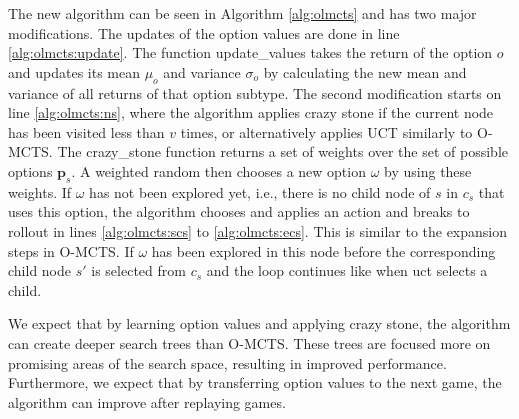 The new algorithm can be seen in Algorithm \ref{alg:olmcts} and has two major
modifications. The updates of the option values are done in line
\ref{alg:olmcts:update}. The function \textsf{update\_values} takes the return
of the option $o$ and updates its mean $\mu_o$ and variance $\sigma_o$ by
calculating the new mean and variance of all returns of that option subtype. The
second modification starts on line \ref{alg:olmcts:ns}, where the algorithm
applies crazy stone if the current node has been visited less than $v$ times, or
alternatively applies UCT similarly to O-MCTS. The \textsf{crazy\_stone}
function returns a set of weights over the set of possible options
$\mathbf{p}_s$. A weighted random then chooses a new option $\omega$ by using
these weights.  If $\omega$ has not been explored yet, i.e., there is no child
node of $s$ in $c_s$ that uses this option, the algorithm chooses and applies an
action and breaks to rollout in lines \ref{alg:olmcts:scs} to
\ref{alg:olmcts:ecs}. This is similar to the expansion steps in O-MCTS. If
$\omega$ has been explored in this node before the corresponding child node
$s'$ is selected from $c_s$ and the loop continues like when \textsf{uct}
selects a child.

We expect that by learning option values and applying crazy stone, the algorithm
can create deeper search trees than O-MCTS. These trees are focused more on
promising areas of the search space, resulting in improved performance.
Furthermore, we expect that by transferring option values to the next game, the
algorithm can improve after replaying games.
